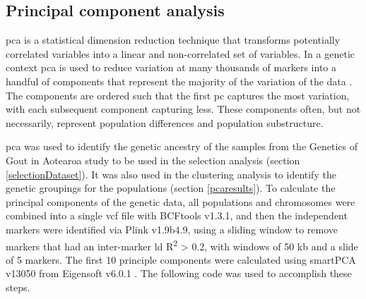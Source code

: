 \documentclass[twoside,openright]{report}
\begin{document}
\subsection{Principal component analysis}\label{pca}

\Glsdesc{pca} is a statistical dimension reduction technique that
transforms potentially correlated variables into a linear and
non-correlated set of variables. In a genetic context \gls{pca} is used
to reduce variation at many thousands of markers into a handful of
components that represent the majority of the variation of the data
\citep{Patterson2006}. The components are ordered such that the first
\gls{pc} captures the most variation, with each subsequent component
capturing less. These components often, but not necessarily, represent
population differences and population substructure.

\gls{pca} was used to identify the genetic ancestry of the samples from
the Genetics of Gout in Aotearoa study to be used in the selection
analysis (section \ref{selectionDataset}). It was also used in the
clustering analysis to identify the genetic groupings for the
populations (section \ref{pcaresults}). To calculate the principal
components of the genetic data, all populations and chromosomes were
combined into a single \gls{vcf} file with BCFtools v1.3.1, and then the
independent markers were identified via Plink v1.9b4.9, using a sliding
window to remove markers that had an inter-marker \gls{ld}
R\textsuperscript{2} \textgreater{} 0.2, with windows of 50 kb and a
slide of 5 markers. The first 10 principle components were calculated
using smartPCA v13050 from Eigensoft v6.0.1 \citep{Price2006}. The
following code was used to accomplish these steps.
\end{document}
